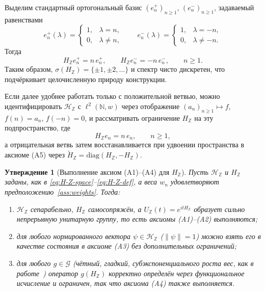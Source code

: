 \documentclass{article}
\numberwithin{equation}{section}
\theoremstyle{plain}
\newtheorem{proposition}{Утверждение}
\theoremstyle{definition}
\theoremstyle{remark}
\begin{document}
Выделим стандартный ортогональный базис \((e_n^+)_{n\ge 1}\),
\((e_n^-)_{n\ge 1}\), задаваемый равенствами
\begin{equation}
\label{eq:basis-en-plus-minus}
e_n^+(\lambda)
=
\begin{cases}
1, & \lambda=n,\\
0, & \lambda\neq n,
\end{cases}
\qquad
e_n^-(\lambda)
=
\begin{cases}
1, & \lambda=-n,\\
0, & \lambda\neq -n.
\end{cases}
\end{equation}
Тогда
\begin{equation}
\label{eq:H-Z-on-basis}
H_{\mathbb Z} e_n^+ = n\,e_n^+,
\qquad
H_{\mathbb Z} e_n^- = -n\,e_n^-,
\qquad n\ge 1.
\end{equation}
Таким образом, \(\sigma(H_{\mathbb Z})=\{\pm 1,\pm 2,\dots\}\) и спектр чисто
дискретен, что подчёркивает целочисленную природу конструкции.

Если далее удобнее работать только с положительной ветвью, можно
идентифицировать \(\mathcal H_{\mathbb Z}\) с \(\ell^2(\mathbb N,w)\) через
отображение
\((a_n)_{n\ge1}\mapsto f\), \(f(n)=a_n\), \(f(-n)=0\), и рассматривать
ограничение \(H_{\mathbb Z}\) на эту подпространство, где
\begin{equation}
\label{eq:H-Z-positive-branch}
H_{\mathbb Z} e_n = n\,e_n,\qquad n\ge 1,
\end{equation}
а отрицательная ветвь затем восстанавливается при удвоении пространства в
аксиоме \textup{(A5)} через
\(\widetilde H_{\mathbb Z}=\mathrm{diag}(H_{\mathbb Z},-H_{\mathbb Z})\).

\begin{proposition}[Выполнение аксиом \textup{(A1)}–\textup{(A4)} для \(H_{\mathbb Z}\)]
\label{prop:A1-A4-for-H-Z}
Пусть \(\mathcal H_{\mathbb Z}\) и \(H_{\mathbb Z}\) заданы, как в
\eqref{eq:H-Z-space}–\eqref{eq:H-Z-def}, а веса \(w_n\) удовлетворяют
предположению~\ref{ass:weights}. Тогда:
\begin{enumerate}[label=(\roman*), leftmargin=2.3em]
  \item \(\mathcal H_{\mathbb Z}\) сепарабельно, \(H_{\mathbb Z}\) самосопряжён,
  а \(U_{\mathbb Z}(t)=e^{itH_{\mathbb Z}}\) образует сильно непрерывную
  унитарную группу, то есть аксиомы \textup{(A1)}–\textup{(A2)} выполняются;

  \item для любого нормированного вектора \(\psi\in\mathcal H_{\mathbb Z}\)
  (\(\|\psi\|=1\)) можно взять его в качестве состояния в аксиоме \textup{(A3)}
  без дополнительных ограничений;

  \item для любого \(g\in\mathcal G\) (чётный, гладкий, субэкспоненциального
  роста вес, как в работе~\cite{Monakhov-QSG-002}) оператор \(g(H_{\mathbb Z})\)
  корректно определён через функциональное исчисление и ограничен, так что
  аксиома \textup{(A4)} также выполняется.
\end{enumerate}
\end{proposition}
\end{document}
